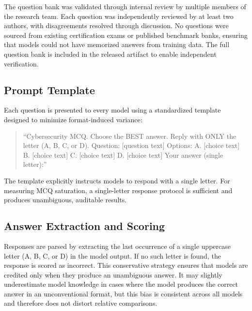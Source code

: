 \documentclass[final]{elsarticle}
\begin{document}
The question bank was validated through internal review by multiple members of the research team. Each question was independently reviewed by at least two authors, with disagreements resolved through discussion. No questions were sourced from existing certification exams or published benchmark banks, ensuring that models could not have memorized answers from training data. The full question bank is included in the released artifact to enable independent verification.

\subsection{Prompt Template}

Each question is presented to every model using a standardized template designed to minimize format-induced variance:

\begin{quote}
\small
``Cybersecurity MCQ. Choose the BEST answer. Reply with ONLY the letter (A, B, C, or D).\newline
Question: [question text]\newline
Options:\newline
A. [choice text]\newline
B. [choice text]\newline
C. [choice text]\newline
D. [choice text]\newline
Your answer (single letter):''
\end{quote}

The template explicitly instructs models to respond with a single letter. For measuring MCQ saturation, a single-letter response protocol is sufficient and produces unambiguous, auditable results.

\subsection{Answer Extraction and Scoring}

Responses are parsed by extracting the last occurrence of a single uppercase letter (A, B, C, or D) in the model output. If no such letter is found, the response is scored as incorrect. This conservative strategy ensures that models are credited only when they produce an unambiguous answer. It may slightly underestimate model knowledge in cases where the model produces the correct answer in an unconventional format, but this bias is consistent across all models and therefore does not distort relative comparisons.
\end{document}
